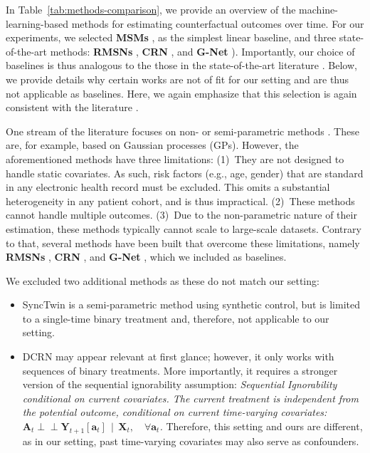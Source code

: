 \documentclass{article}
\theoremstyle{plain}
\theoremstyle{definition}
\theoremstyle{remark}
\newcommand{\ind}{\perp\!\!\!\!\perp}
\begin{document}
In Table~\ref{tab:methods-comparison}, we provide an overview of the machine-learning-based methods for estimating counterfactual outcomes over time. For our experiments, we selected \textbf{MSMs} \cite{robins2000marginal,hernan2001marginal}, as the simplest linear baseline, and three state-of-the-art methods: \textbf{RMSNs} \cite{lim2018forecasting}, \textbf{CRN} \cite{bica2020estimating}, and \textbf{G-Net} \cite{li2021g}). Importantly, our choice of baselines is thus analogous to the those in the state-of-the-art literature \cite{lim2018forecasting,bica2020estimating,li2021g}. Below, we provide details why certain works are not of fit for our setting and are thus not applicable as baselines. Here, we again emphasize that this selection is again consistent with the literature \cite{lim2018forecasting,bica2020estimating,li2021g}.

One stream of the literature focuses on non- or semi-parametric methods \cite{Xu16,schulam2017reliable,soleimani2017treatment}. These are, for example, based on Gaussian processes (GPs). However, the aforementioned methods have three limitations: (1)~They are not designed to handle static covariates. As such, risk factors (e.g., age, gender) that are standard in any electronic health record must be excluded. This omits a substantial heterogeneity in any patient cohort, and is thus impractical. (2)~These methods cannot handle multiple outcomes. (3)~Due to the non-parametric nature of their estimation, these methods typically cannot scale to large-scale datasets. Contrary to that, several methods have been built that overcome these limitations, namely \textbf{RMSNs} \cite{lim2018forecasting}, \textbf{CRN} \cite{bica2020estimating}, and \textbf{G-Net} \cite{li2021g}, which we included as baselines.

We excluded two additional methods as these do not match our setting: 
\begin{itemize}
\item SyncTwin \cite{qian2021synctwin} is a semi-parametric method using synthetic control, but is limited to a single-time binary treatment and, therefore, not applicable to our setting.
\item DCRN \cite{berrevoets2021disentangled} may appear relevant at first glance; however, it only works with sequences of binary treatments. More importantly, it requires a stronger version of the sequential ignorability assumption: \emph{Sequential Ignorability conditional on current covariates. The current treatment is independent from the potential outcome, conditional on current time-varying covariates: $\mathbf{A}_{t} \ind \mathbf{Y}_{t+1}[\mathbf{a}_t] \,\mid\, \mathbf{X}_{t}, \quad \forall \mathbf{a}_t$.} Therefore, this setting and ours are  different, as in our setting, past time-varying covariates may also serve as confounders.
\end{itemize}
\end{document}
